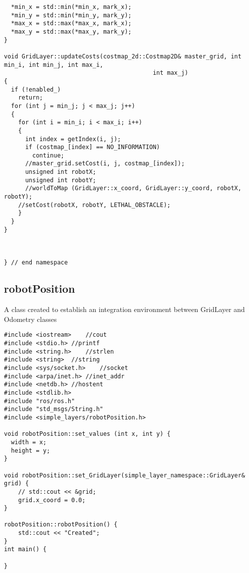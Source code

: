 \begin{lstlisting}
  *min_x = std::min(*min_x, mark_x);
  *min_y = std::min(*min_y, mark_y);
  *max_x = std::max(*max_x, mark_x);
  *max_y = std::max(*max_y, mark_y);
}

void GridLayer::updateCosts(costmap_2d::Costmap2D& master_grid, int min_i, int min_j, int max_i,
                                          int max_j)
{
  if (!enabled_)
    return;
  for (int j = min_j; j < max_j; j++)
  {
    for (int i = min_i; i < max_i; i++)
    {
      int index = getIndex(i, j);
      if (costmap_[index] == NO_INFORMATION)
        continue;
      //master_grid.setCost(i, j, costmap_[index]); 
      unsigned int robotX;
      unsigned int robotY;
      //worldToMap (GridLayer::x_coord, GridLayer::y_coord, robotX, robotY);
    //setCost(robotX, robotY, LETHAL_OBSTACLE);
    }
  }
}



} // end namespace
\end{lstlisting}
\subsection{robotPosition}
A class created to establish an integration environment between GridLayer and Odometry classes
\begin{lstlisting}
#include <iostream>    //cout
#include <stdio.h> //printf
#include <string.h>    //strlen
#include <string>  //string
#include <sys/socket.h>    //socket
#include <arpa/inet.h> //inet_addr
#include <netdb.h> //hostent
#include <stdlib.h>
#include "ros/ros.h"
#include "std_msgs/String.h"
#include <simple_layers/robotPosition.h>

void robotPosition::set_values (int x, int y) {
  width = x;
  height = y;
}

void robotPosition::set_GridLayer(simple_layer_namespace::GridLayer& grid) {
    // std::cout << &grid;
    grid.x_coord = 0.0;
}

robotPosition::robotPosition() {
    std::cout << "Created";
}
int main() {

}
\end{lstlisting}

